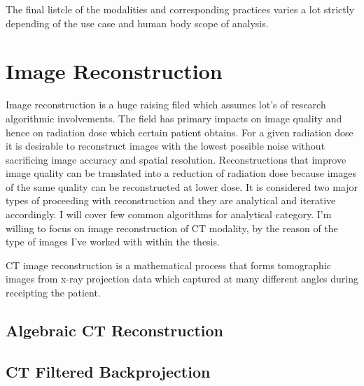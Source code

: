 The final listcle of the modalities and corresponding practices varies a lot strictly depending of the use case and human body scope of analysis.

\section{Image Reconstruction}
Image reconstruction is a huge raising filed which assumes lot's of research algorithmic involvements. The field has primary impacts on image quality and hence on radiation dose which certain patient obtains. For a given radiation dose it is desirable to reconstruct images with the lowest possible noise without sacrificing image accuracy and spatial resolution. Reconstructions that improve image quality can be translated into a reduction of radiation dose because images of the same quality can be reconstructed at lower dose. It is considered two major types of proceeding with reconstruction and they are analytical and iterative accordingly. I will cover few common algorithms for analytical category. I'm willing to focus on image reconstruction of CT modality, by the reason of the type of images I've worked with within the thesis.

CT image reconstruction is a mathematical process that forms tomographic images from x-ray projection data which captured at many different angles during receipting the patient. 

\subsection{Algebraic CT Reconstruction}

\subsection{CT Filtered Backprojection}

